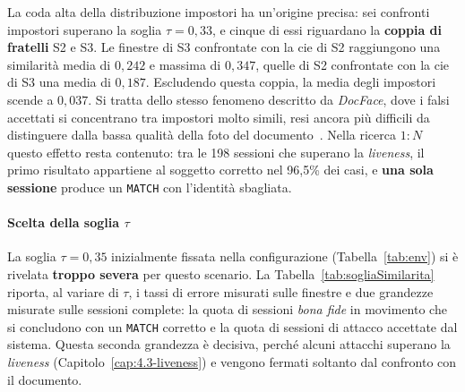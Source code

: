 La coda alta della distribuzione impostori ha un'origine precisa: sei confronti impostori superano la soglia $\tau = 0{,}33$, e cinque di essi riguardano la \textbf{coppia di fratelli} S2 e S3.
Le finestre di S3 confrontate con la \gls{cie} di S2 raggiungono una similarità media di $0{,}242$ e massima di $0{,}347$, quelle di S2 confrontate con la \gls{cie} di S3 una media di $0{,}187$.
Escludendo questa coppia, la media degli impostori scende a $0{,}037$.
Si tratta dello stesso fenomeno descritto da \textit{DocFace}, dove i falsi accettati si concentrano tra impostori molto simili, resi ancora più difficili da distinguere dalla bassa qualità della foto del documento~\cite{shiDocFaceMatchingID2018}.
Nella ricerca $1{:}N$ questo effetto resta contenuto: tra le 198 sessioni che superano la \textit{liveness}, il primo risultato appartiene al soggetto corretto nel 96,5\% dei casi, e \textbf{una sola sessione} produce un \texttt{MATCH} con l'identità sbagliata.
\paragraph{Scelta della soglia $\tau$}
La soglia $\tau = 0{,}35$ inizialmente fissata nella configurazione (Tabella~\ref{tab:env}) si è rivelata \textbf{troppo severa} per questo scenario.
La Tabella~\ref{tab:sogliaSimilarita} riporta, al variare di $\tau$, i tassi di errore misurati sulle finestre e due grandezze misurate sulle sessioni complete: la quota di sessioni \textit{bona fide} in movimento che si concludono con un \texttt{MATCH} corretto e la quota di sessioni di attacco accettate dal sistema.
Questa seconda grandezza è decisiva, perché alcuni attacchi superano la \textit{liveness} (Capitolo~\ref{cap:4.3-liveness}) e vengono fermati soltanto dal confronto con il documento.


